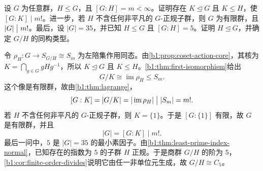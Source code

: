 \begin{exercise}\label{b1:ex:04-6}
	设 \(G\) 为任意群，\(H\leq G\)，且 \([G:H]=m<\infty\)。证明存在 \(K\trianglelefteq G\) 且 \(K\leq H\)，使 \([G:K]\mid m!\)。进一步，若 \(H\) 不含任何非平凡的 \(G\)-正规子群，则 \(G\) 为有限群，且 \(|G|\bigm\vert m!\)。最后，设 \(|G|=35\)，并已知 \(H\leq G\) 且 \([G:H]=5\)。证明 \(H\trianglelefteq G\)，并确定 \(G/H\) 的同构类型。
\end{exercise}
\begin{solution}
	令 \(\rho_H:G\rightarrow S_{G/H}\cong S_m\) 为左陪集作用同态。由\cref{b1:prop:coset-action-core}，其核为 \(K=\bigcap_{g\in G}gHg^{-1}\)，所以 \(K\trianglelefteq G\) 且 \(K\leq H\)。\cref{b1:thm:first-isomorphism}给出
	\[
		G/K\cong\operatorname{im}\rho_H\leq S_m.
	\]
	这个像是有限群，故由\cref{b1:thm:lagrange}，
	\[
		[G:K]=|G/K|=|\operatorname{im}\rho_H|\bigm\vert|S_m|=m!.
	\]
	若 \(H\) 不含任何非平凡的 \(G\)-正规子群，则 \(K=\{1\}\)。于是 \([G:\{1\}]\) 有限，故 \(G\) 是有限群，并且
	\[
		|G|=[G:K]\mid m!.
	\]
	最后一问中，\(5\) 是 \(|G|=35\) 的最小素因子。由\cref{b1:thm:least-prime-index-normal}，已知存在的指数为 \(5\) 的子群 \(H\) 正规。于是商群 \(G/H\) 的阶为 \(5\)，\cref{b1:cor:finite-order-divides}说明它由任一非单位元生成，故 \(G/H\cong C_5\)。
\end{solution}

